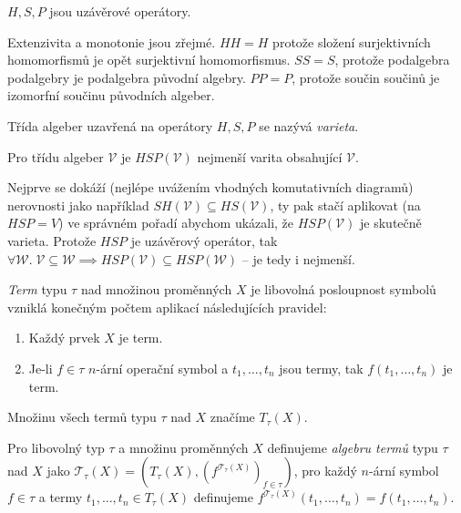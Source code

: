 \begin{claim}
$H,S,P$ jsou uzávěrové operátory.
\end{claim}

Extenzivita a monotonie jsou zřejmé. $HH = H$ protože složení
surjektivních homomorfismů je opět surjektivní homomorfismus.
$SS = S$, protože podalgebra podalgebry je podalgebra původní algebry.
$PP = P$, protože součin součinů je izomorfní součinu původních algeber.

\begin{definition}
    Třída algeber uzavřená na operátory $H, S, P$ se nazývá
    {\em varieta}.
\end{definition}

\begin{theorem}
    Pro třídu algeber $\mathcal{V}$ je
    $HSP(\mathcal{V})$ nejmenší varita obsahující $\mathcal{V}$.
\end{theorem}

Nejprve se dokáží (nejlépe uvážením vhodných komutativních diagramů)
nerovnosti jako například
$SH(\mathcal{V}) \subseteq HS(\mathcal{V})$,
ty pak stačí aplikovat (na $HSP = V$) ve správném pořadí abychom ukázali, že
$HSP(\mathcal{V})$ je skutečně varieta. Protože $HSP$ je uzávěrový
operátor, tak
$\forall \mathcal{W}. \; \mathcal{V} \subseteq \mathcal{W} \implies
HSP(\mathcal{V}) \subseteq HSP(\mathcal{W})$ -- je tedy i nejmenší.

\begin{definition}[Term]
{\em Term} typu $\tau$ nad množinou proměnných $X$ je libovolná
posloupnost symbolů vzniklá konečným počtem aplikací následujících
pravidel:
\begin{enumerate}
    \item Každý prvek $X$ je term.
    \item Je-li $f \in \tau$ $n$-ární operační symbol a $t_1, \ldots, t_n$
        jsou termy, tak $f(t_1, \ldots, t_n)$ je term.
\end{enumerate}
\noindent
Množinu všech termů typu $\tau$ nad $X$ značíme $T_\tau(X)$.
\end{definition}

\begin{example}
\end{example}

\begin{definition}
Pro libovolný typ $\tau$ a množinu proměnných $X$ definujeme
{\em algebru termů} typu $\tau$ nad $X$ jako
$\mathcal{T}_\tau(X) = (T_\tau(X), (f^{\mathcal{T}_\tau(X)})_{f \in \tau})$,
pro každý $n$-ární symbol $f \in \tau$ a termy
$t_1, \ldots, t_n \in T_\tau(X)$ definujeme
\linebreak
$f^{\mathcal{T}_\tau(X)}(t_1, \ldots, t_n) = f(t_1, \ldots, t_n)$.
\end{definition}


